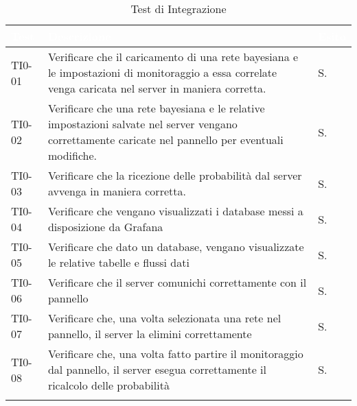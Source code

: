 \begin{longtable}{|C{.15\textwidth}|m{.52\textwidth}|m{.08\textwidth}|}
\hline
{}\textbf{\textcolor{white}{Test}} & \textbf{\textcolor{white}{Descrizione}} & \textbf{\textcolor{white}{Esito}}\\
\hline \hline
\endhead

TI0-01 & Verificare che il caricamento di una rete bayesiana e le impostazioni di monitoraggio a essa correlate venga caricata nel server in maniera corretta. & S. \\
\hline
{} TI0-02 & Verificare che una rete bayesiana e le relative impostazioni salvate nel server vengano correttamente caricate nel pannello per eventuali modifiche. & S. \\
\hline
TI0-03 & Verificare che la ricezione delle probabilità dal server avvenga in maniera corretta. & S. \\
\hline
{} TI0-04 & Verificare che vengano visualizzati i database messi a disposizione da Grafana & S. \\
\hline
TI0-05 & Verificare che dato un database, vengano visualizzate le relative tabelle e flussi dati & S. \\
\hline
{}TI0-06 & Verificare che il server comunichi correttamente con il pannello & S. \\
\hline
TI0-07 & Verificare che, una volta selezionata una rete nel pannello, il server la elimini correttamente & S. \\
\hline 
{}TI0-08 & Verificare che, una volta fatto partire il monitoraggio dal pannello, il server esegua correttamente il ricalcolo delle probabilità & S. \\  
\hline

\caption{Test di Integrazione}
\label{testintegrazione}
\end{longtable}